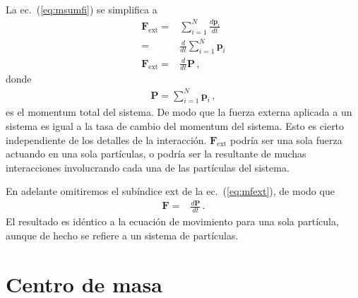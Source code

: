 La ec.~(\ref{eq:msumfi}) se simplifica a
\begin{align}
  \label{eq:mfext}
  \mathbf{F}_{\text{ext}}=&\sum_{i=1}^N \frac{d\mathbf{p}_i}{dt}\nonumber\\
  =& \frac{d}{dt}\sum_{i=1}^N\mathbf{p}_i\nonumber\\
 \mathbf{F}_{\text{ext}} =& \frac{d}{dt}\mathbf{P}\,,
\end{align}
donde
\begin{align}
  \mathbf{P}=\sum_{i=1}^N\mathbf{p}_i\,,
\end{align}
es el momentum total del sistema. De modo que la fuerza externa aplicada a un sistema es igual a la tasa de cambio del momentum del sistema. Esto es cierto independiente de los detalles de la interacción. $\mathbf{F}_{\text{ext}}$ podría ser una sola fuerza actuando en una sola partículas, o podría ser la resultante de muchas interacciones involucrando cada una de las partículas del sistema.

En adelante omitiremos el subíndice ext de la ec.~(\ref{eq:mfext}), de modo que
\begin{align}
  \label{eq:mfdpdt}
  \mathbf{F}=&\frac{d\mathbf{P}}{dt}\,.
\end{align}
El resultado es idéntico a la ecuación de movimiento para una sola partícula, aunque de hecho se refiere a un sistema de partículas. 


\section{Centro de masa}




